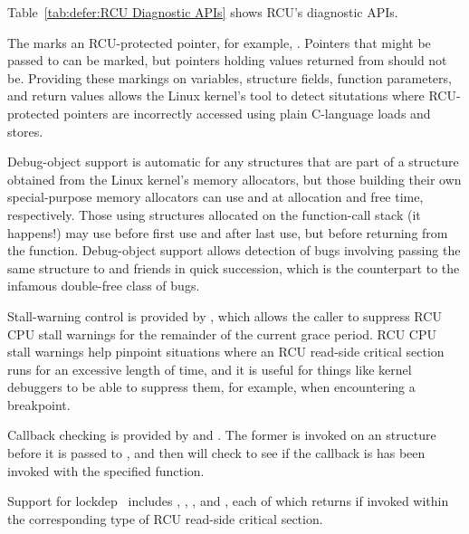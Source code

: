 Table~\ref{tab:defer:RCU Diagnostic APIs}
shows RCU's diagnostic APIs.

The  marks an RCU-protected pointer, for example,
.
Pointers that might be passed to  can be marked,
but pointers holding values returned from 
should not be.
Providing these markings on variables, structure fields, function
parameters, and return values allows the Linux kernel's 
tool to detect situtations where RCU-protected pointers are
incorrectly accessed using plain C-language loads and stores.

Debug-object support is automatic for any  structures
that are part of a structure obtained from the Linux kernel's
memory allocators, but those building their own special-purpose
memory allocators can use  and 
at allocation and free time, respectively.
Those using  structures allocated on the function-call
stack (it happens!) may use 
before first use and  after last use,
but before returning from the function.
Debug-object support allows detection of bugs involving passing the
same  structure to  and friends in
quick succession, which is the  counterpart to the
infamous double-free class of bugs.

Stall-warning control is provided by , which
allows the caller to suppress RCU CPU stall warnings for the remainder
of the current grace period.
RCU CPU stall warnings help pinpoint situations where an RCU read-side
critical section runs for an excessive length of time, and it is useful
for things like kernel debuggers to be able to suppress them, for example,
when encountering a breakpoint.

Callback checking is provided by  and
.
The former is invoked on an  structure before it is passed
to , and then  will
check to see if the callback is has been invoked with the specified
function.

Support for lockdep~\cite{JonathanCorbet2006lockdep} includes
,
,
, and
,
each of which returns  if invoked within the corresponding
type of RCU read-side critical section.

